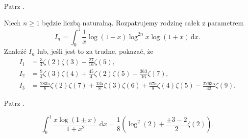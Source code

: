 
\begin{solution}
    Patrz \cite[s. 4, 5]{valean19}.
\end{solution}


\begin{problem_with_solution}
    \label{valean_1_10}%
    Niech $n \ge 1$ będzie liczbą naturalną.
    Rozpatrujemy rodzinę całek z parametrem
    \begin{equation}
        I_n = \int_0^1 \frac 1 x \log(1-x) \log^{2n} x \log (1+x) \,\mathrm{d}x.
    \end{equation}
    Znaleźć $I_n$ lub, jeśli jest to za trudne, pokazać, że
    \begin{align}
        I_1 & = \frac 3 4 \zeta (2) \zeta (3) - \frac {27}{16} \zeta(5), \\
        I_2 & = \frac 9 4 \zeta (3) \zeta (4) + \frac{45}{4} \zeta(2) \zeta(5) - \frac{363}{16} \zeta (7), \\
        I_3 & = \frac{2835}{8} \zeta(2) \zeta (7) + \frac {135}{8} \zeta (3) \zeta (6) + \frac {675}{8} \zeta (4) \zeta (5) - \frac {22635}{32} \zeta (9).
    \end{align} 
\end{problem_with_solution}


\begin{solution}
    Patrz \cite[s. 6, 7]{valean19}.
\end{solution}

\begin{problem_with_solution}
    \label{valean_1_13}%
    \begin{equation}
        \int_0^1 \frac{x \log (1 \pm x)}{1 + x^2} \, \mathrm{d} x = \frac 1 8 \left(\log^2 (2) + \frac{\pm 3 - 2}{2} \zeta(2)\right).
    \end{equation} 
\end{problem_with_solution}


